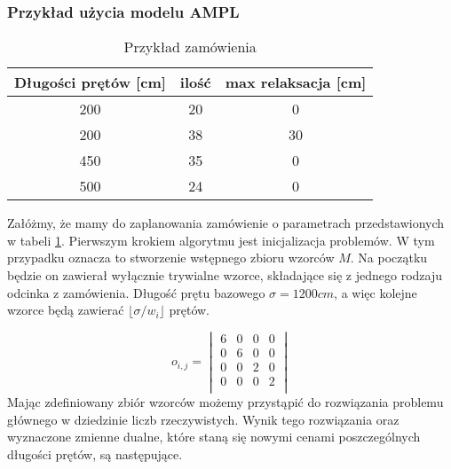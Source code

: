 \subsubsection{Przykład użycia modelu AMPL}

\begin{table}[b]
\centering
\caption{Przykład zamówienia}
\label{order1}
\begin{tabular}{ccc}
\hline
Długości prętów [cm] & ilość & max relaksacja [cm]\\\hline\hline
200 & 20 & 0\\
200 & 38 & 30\\
450 & 35 & 0\\
500 & 24 & 0\\
\hline
\end{tabular}
\end{table}

Załóżmy, że mamy do zaplanowania zamówienie o parametrach przedstawionych w tabeli \ref{order1}. Pierwszym krokiem algorytmu jest inicjalizacja problemów. W tym przypadku oznacza to stworzenie wstępnego zbioru wzorców \(M\). Na początku będzie on zawierał wyłącznie trywialne wzorce, składające się z jednego rodzaju odcinka z zamówienia. Długość prętu bazowego \(\sigma = 1200cm\), a więc kolejne wzorce będą zawierać \(\lfloor \sigma/w_i \rfloor\) prętów.

\[
    o_{i,j} = 
    \begin{vmatrix}
        6 & 0 & 0 & 0 \\
        0 & 6 & 0 & 0 \\
        0 & 0 & 2 & 0 \\
        0 & 0 & 0 & 2 \\
    \end{vmatrix}
\]
Mając zdefiniowany zbiór wzorców możemy przystąpić do rozwiązania problemu głównego w dziedzinie liczb rzeczywistych. Wynik tego rozwiązania oraz wyznaczone zmienne dualne, które staną się nowymi cenami poszczególnych długości prętów, są następujące.

